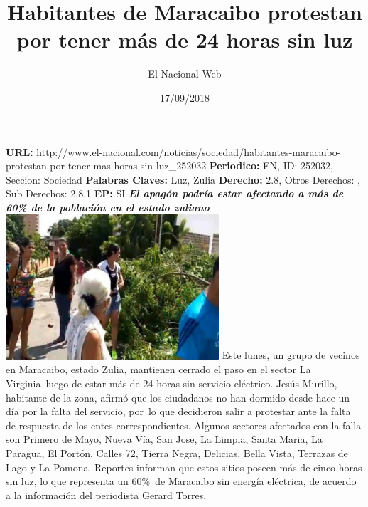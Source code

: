 \documentclass{article}%
\title{\textbf{Habitantes de Maracaibo protestan por tener más de 24 horas sin luz}}%
\author{El Nacional Web}%
\date{17/09/2018}%
\begin{document}
%
\normalsize%
\maketitle%
\textbf{URL: }%
http://www.el{-}nacional.com/noticias/sociedad/habitantes{-}maracaibo{-}protestan{-}por{-}tener{-}mas{-}horas{-}sin{-}luz\_252032\newline%
%
\textbf{Periodico: }%
EN, %
ID: %
252032, %
Seccion: %
Sociedad\newline%
%
\textbf{Palabras Claves: }%
Luz, Zulia\newline%
%
\textbf{Derecho: }%
2.8, %
Otros Derechos: %
, %
Sub Derechos: %
2.8.1\newline%
%
\textbf{EP: }%
SI\newline%
\newline%
%
\textbf{\textit{El apagón podría estar afectando a más de 60\% de la población en el estado zuliano~}}%
\newline%
\newline%
%
\includegraphics[width=300px]{214.jpg}%
\newline%
%
Este lunes, un grupo de vecinos en Maracaibo, estado Zulia, mantienen cerrado el paso en el sector La Virginia~luego de estar más de 24 horas sin servicio eléctrico.%
\newline%
%
Jesús Murillo, habitante de la zona, afirmó que los ciudadanos no han dormido desde hace un día por la falta del servicio, por~lo que decidieron salir a protestar ante la falta de respuesta de los entes correspondientes.%
\newline%
%
Algunos sectores afectados con la falla son Primero de Mayo, Nueva Vía, San Jose, La Limpia, Santa Maria, La Paragua, El Portón, Calles 72, Tierra Negra, Delicias, Bella Vista, Terrazas de Lago y La Pomona.%
\newline%
%
Reportes informan que estos sitios poseen más de cinco horas sin luz, lo que representa un 60\%~de Maracaibo sin energía eléctrica, de acuerdo a la información del periodista Gerard Torres.%
\newline%
%
\end{document}
